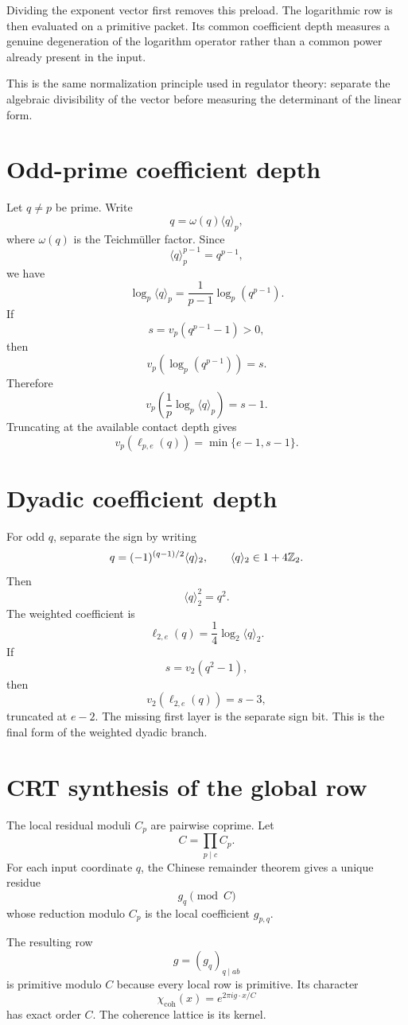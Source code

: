 Dividing the exponent vector first removes this preload. The logarithmic row is then evaluated on a primitive packet. Its common coefficient depth measures a genuine degeneration of the logarithm operator rather than a common power already present in the input.

This is the same normalization principle used in regulator theory: separate the algebraic divisibility of the vector before measuring the determinant of the linear form.

\section{Odd-prime coefficient depth}
Let $q\neq p$ be prime. Write
\[
 q=\omega(q)\langle q\rangle_p,
\]
where $\omega(q)$ is the Teichm\"uller factor. Since
\[
 \langle q\rangle_p^{p-1}=q^{p-1},
\]
we have
\[
 \log_p\langle q\rangle_p
 =
 \frac1{p-1}\log_p(q^{p-1}).
\]
If
\[
 s=v_p(q^{p-1}-1)>0,
\]
then
\[
 v_p(\log_p(q^{p-1}))=s.
\]
Therefore
\[
 v_p\left(\frac1p\log_p\langle q\rangle_p\right)
 =s-1.
\]
Truncating at the available contact depth gives
\[
 v_p(\ell_{p,e}(q))
 =
 \min\{e-1,s-1\}.
\]

\section{Dyadic coefficient depth}
For odd $q$, separate the sign by writing
\[
 q=(-1)^{(q-1)/2}\langle q\rangle_2,
 \qquad
 \langle q\rangle_2\in1+4\mathbb Z_2.
\]
Then
\[
 \langle q\rangle_2^2=q^2.
\]
The weighted coefficient is
\[
 \ell_{2,e}(q)
 =
 \frac14\log_2\langle q\rangle_2.
\]
If
\[
 s=v_2(q^2-1),
\]
then
\[
 v_2(\ell_{2,e}(q))=s-3,
\]
truncated at $e-2$. The missing first layer is the separate sign bit. This is the final form of the weighted dyadic branch.

\section{CRT synthesis of the global row}
The local residual moduli $C_p$ are pairwise coprime. Let
\[
 C=\prod_{p\mid c}C_p.
\]
For each input coordinate $q$, the Chinese remainder theorem gives a unique residue
\[
 g_q\pmod C
\]
whose reduction modulo $C_p$ is the local coefficient $g_{p,q}$.

The resulting row
\[
 g=(g_q)_{q\mid ab}
\]
is primitive modulo $C$ because every local row is primitive. Its character
\[
 \chi_{\mathrm{coh}}(x)
 =
 e^{2\pi i g\cdot x/C}
\]
has exact order $C$. The coherence lattice is its kernel.

